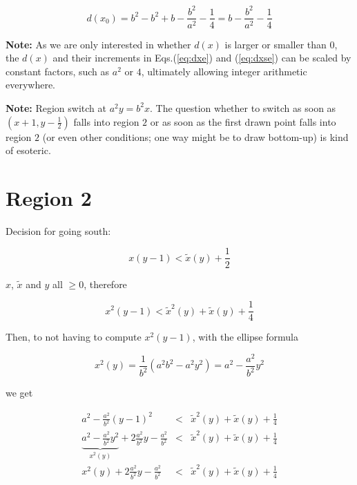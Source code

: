 \documentclass[12pt]{scrartcl}
\def\xym{x(y-1)}
\def\txy{\widetilde{x}(y)}
\def\xys{x^2(y)}
\def\xyms{x^2(y-1)}
\def\txys{\widetilde{x}^2(y)}
\def\fba{\frac{b^2}{a^2}}
\def\fab{\frac{a^2}{b^2}}
\def\dx{d(x)}
\def\fof{\frac{1}{4}}
\begin{document}
$$ d(x_0) = b^2 - b^2 + b - \fba - \fof = b - \fba - \fof $$

\textbf{Note:} As we are only interested in whether $\dx$ is larger or
smaller than $0$, the $\dx$ and their increments in Eqs.(\ref{eq:dxe}) 
and (\ref{eq:dxse}) can be scaled by constant factors, such as $a^2$
or $4$, ultimately allowing integer arithmetic everywhere.

\vspace*{1em}
\textbf{Note:} Region switch at $ a^2y = b^2x $. The question whether to
switch as soon as $\left( x+1, y-\frac{1}{2} \right)$ falls into region
$2$ or as soon as the first drawn point falls into region $2$ (or even
other conditions; one way might be to draw bottom-up) is kind of esoteric.

\section*{Region 2}

\begin{center}
\end{center}

Decision for going south:

$$ \xym < \txy + \frac{1}{2} $$

$x$, $\widetilde{x}$ and $y$ all $\geq 0$, therefore

$$ \xyms < \txys + \txy + \fof $$

Then, to not having to compute $\xyms$, with the ellipse formula

$$ \xys = \frac{1}{b^2} \left( a^2b^2-a^2y^2 \right) = a^2 - \fab y^2 $$

we get

\begin{eqnarray*}
                                 a^2 - \fab (y-1)^2 &<& \txys + \txy + \fof \\
\underbrace{a^2 - \fab y^2}_{\xys} + 2\fab y - \fab &<& \txys + \txy + \fof \\
                              \xys + 2\fab y - \fab &<& \txys + \txy + \fof
\end{eqnarray*}
\end{document}
